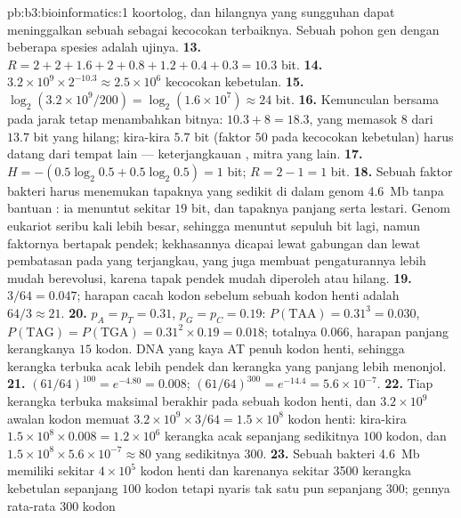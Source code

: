 \begin{solution}{pb:b3:bioinformatics:1}
koortolog, dan hilangnya  yang sungguhan dapat meninggalkan sebuah
 sebagai kecocokan terbaiknya. Sebuah pohon gen dengan beberapa
spesies adalah ujinya.
\textbf{13.} $R = 2 + 2 + 1.6 + 2 + 0.8 + 1.2 + 0.4 + 0.3 = 10.3$ bit.
\textbf{14.} $3.2\times 10^{9}\times 2^{-10.3} \approx 2.5\times 10^{6}$
kecocokan kebetulan.
\textbf{15.} $\log_{2}(3.2\times 10^{9}/200) = \log_{2}(1.6\times 10^{7})
\approx 24$ bit.
\textbf{16.} Kemunculan bersama pada jarak tetap menambahkan bitnya: $10.3 + 8 =
18.3$, yang memasok $8$ dari $13.7$ bit yang hilang; kira-kira $5.7$ bit
(faktor $50$ pada kecocokan kebetulan) harus datang dari tempat lain ---
keterjangkauan , mitra yang lain.
\textbf{17.} $H = -(0.5\log_{2}0.5 + 0.5\log_{2}0.5) = 1$ bit; $R = 2 -
1 = 1$ bit.
\textbf{18.} Sebuah faktor bakteri harus menemukan tapaknya yang sedikit di
dalam genom \qty{4.6}{Mb} tanpa bantuan : ia menuntut sekitar $19$
bit, dan tapaknya panjang serta lestari. Genom eukariot seribu kali lebih
besar, sehingga menuntut sepuluh bit lagi, namun faktornya bertapak pendek;
kekhasannya dicapai lewat gabungan dan lewat pembatasan pada  yang
terjangkau, yang juga membuat pengaturannya lebih mudah berevolusi, karena
tapak pendek mudah diperoleh atau hilang.
\textbf{19.} $3/64 = 0.047$; harapan cacah kodon sebelum sebuah kodon henti
adalah $64/3 \approx 21$.
\textbf{20.} $p_{A} = p_{T} = 0.31$, $p_{G} = p_{C} = 0.19$: $P(\text{TAA})
= 0.31^{3} = 0.030$, $P(\text{TAG}) = P(\text{TGA}) = 0.31^{2}\times 0.19
= 0.018$; totalnya $0.066$, harapan panjang kerangkanya $15$ kodon. DNA yang
kaya AT penuh kodon henti, sehingga kerangka terbuka acak lebih pendek dan
kerangka yang panjang lebih menonjol.
\textbf{21.} $(61/64)^{100} = e^{-4.80} = 0.008$; $(61/64)^{300} =
e^{-14.4} = 5.6\times 10^{-7}$.
\textbf{22.} Tiap kerangka terbuka maksimal berakhir pada sebuah kodon henti,
dan $3.2\times
10^{9}$ awalan kodon memuat $3.2\times 10^{9}\times 3/64 = 1.5\times
10^{8}$ kodon henti: kira-kira $1.5\times 10^{8}\times 0.008 = 1.2\times 10^{6}$
kerangka acak sepanjang sedikitnya $100$ kodon, dan $1.5\times 10^{8}\times
5.6\times 10^{-7} \approx 80$ yang sedikitnya $300$.
\textbf{23.} Sebuah bakteri \qty{4.6}{Mb} memiliki sekitar $4\times 10^{5}$
kodon henti dan karenanya sekitar \num{3500} kerangka kebetulan sepanjang $100$
kodon tetapi nyaris tak satu pun sepanjang $300$; gennya rata-rata $300$ kodon

\end{solution}
